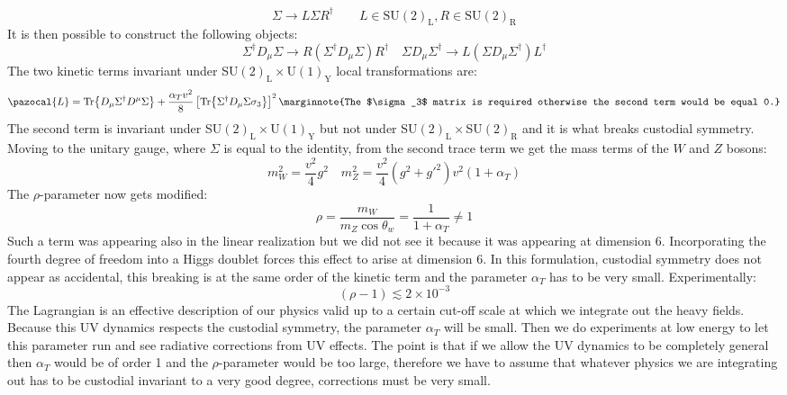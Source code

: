 \documentclass[../main.tex]{subfiles}
\begin{document}
\[
\Sigma\to L\Sigma R^\dagger \qquad L\in\text{SU}(2)_{\text{L}}, R\in\text{SU}(2)_{\text{R}}
\]
It is then possible to construct the following objects:
\[
\Sigma^\dagger D_\mu\Sigma\to R(\Sigma^\dagger D_\mu\Sigma)R^\dagger \quad \Sigma D_\mu\Sigma^\dagger\to L(\Sigma D_\mu\Sigma^\dagger)L^\dagger
\]
The two kinetic terms invariant under SU$(2)_{\text{L}}\times$U$(1)_{\text{Y}}$ local transformations are:
\[
\pazocal{L}=\Tr{D_\mu\Sigma^\dagger D^\mu\Sigma}+\frac{\alpha_Tv^2}{8}\left[\Tr{\Sigma^\dagger D_\mu\Sigma\sigma_3}\right]^2
\marginnote{The $\sigma_3$ matrix is required otherwise the second term would be equal 0.}
\]
The second term is invariant under SU$(2)_{\text{L}}\times$U$(1)_{\text{Y}}$ but not under SU$(2)_{\text{L}}\times$SU$(2)_{\text{R}}$ and it is what breaks custodial symmetry. Moving to the unitary gauge, where $\Sigma$ is equal to the identity, from the second trace term we get the mass terms of the $W$ and $Z$ bosons:
\[
m_W^2=\frac{v^2}{4}g^2 \quad m_Z^2=\frac{v^2}{4}(g^2+g'^2)v^2(1+\alpha_T)
\]
The $\rho$-parameter now gets modified:
\[
\rho=\frac{m_W}{m_Z\cos\theta_w}=\frac{1}{1+\alpha_T}\neq1
\]
Such a term was appearing also in the linear realization but we did not see it because it was appearing at dimension 6. Incorporating the fourth degree of freedom into a Higgs doublet forces this effect to arise at dimension 6. In this formulation, custodial symmetry does not appear as accidental, this breaking is at the same order of the kinetic term and the parameter $\alpha_T$ has to be very small. Experimentally:
\[
(\rho-1)\lesssim2\times10^{-3}
\]
The Lagrangian is an effective description of our physics valid up to a certain cut-off scale at which we integrate out the heavy fields. Because this UV dynamics respects the custodial symmetry, the parameter $\alpha_T$ will be small. Then we do experiments at low energy to let this parameter run and see radiative corrections from UV effects. The point is that if we allow the UV dynamics to be completely general then $\alpha_T$ would be of order 1 and the $\rho$-parameter would be too large, therefore we have to assume that whatever physics we are integrating out has to be custodial invariant to a very good degree, corrections must be very small.\\
\end{document}
